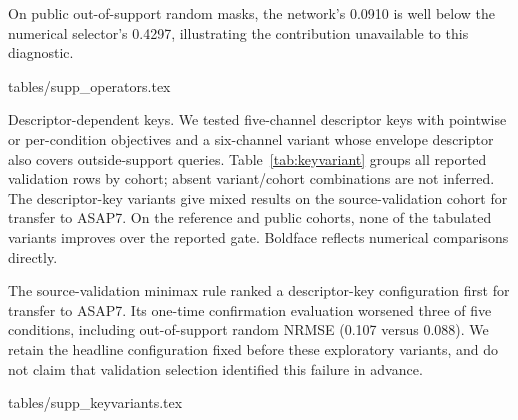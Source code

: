 \documentclass{article}
\makeatletter
\renewcommand{\paragraph}{\@startsection{paragraph}{4}{\z@}
  {4pt plus 1pt minus 1pt}{-1em}{\normalsize\bf}}
\newcommand{\tabdir}{tables}
\newcommand{\tableinput}[1]{\@@input \tabdir/#1 }
\makeatother
\begin{document}
On public out-of-support
random masks, the network's 0.0910 is well below the numerical selector's
0.4297, illustrating the contribution unavailable to this diagnostic.

\begin{table}[htbp]
\centering
\caption{\textbf{Numerical-operator diagnostics at 30\% random missingness.}
NRMSE ($\downarrow$). Best operator* is scored on its applicability subset;
parentheses identify the operator. The label selector reads query truth,
uses only numerical branches and is not a deployable method or a bound
on the full network. Other columns use the full query population.
Bold marks the lowest displayed NRMSE; underlining marks the second-lowest
displayed Ours value. Populations and label
access differ as described above.}
\label{tab:elements}
\tableinput{supp_operators.tex}
\end{table}

\paragraph{Descriptor-dependent keys.}
We tested five-channel descriptor keys with pointwise or per-condition
objectives and a six-channel variant whose envelope descriptor also covers
outside-support queries. Table~\ref{tab:keyvariant} groups all reported
validation rows by cohort; absent variant/cohort combinations are not inferred.
The descriptor-key variants give mixed results on the source-validation
cohort for transfer to ASAP7.
On the reference and public cohorts, none of the tabulated variants improves
over the reported gate. Boldface reflects numerical comparisons directly.

The source-validation minimax rule ranked a descriptor-key configuration
first for transfer to ASAP7. Its one-time confirmation evaluation worsened three of five conditions,
including out-of-support random NRMSE (0.107 versus 0.088). We retain the
headline configuration fixed before these exploratory variants, and do not
claim that validation selection identified this failure in advance.

\begin{table}[htbp]
\centering
\caption{\textbf{Descriptor-key validation diagnostics at 30\% missingness.}
NRMSE ($\downarrow$), grouped by cohort. Bold marks the lowest NRMSE
among all gates in each cohort/condition; underlining marks our second-best
value. All available rows are retained.
The transfer row uses only FreePDK15 source-validation tables, not ASAP7 labels.}
\label{tab:keyvariant}
\tableinput{supp_keyvariants.tex}
\end{table}
\end{document}

